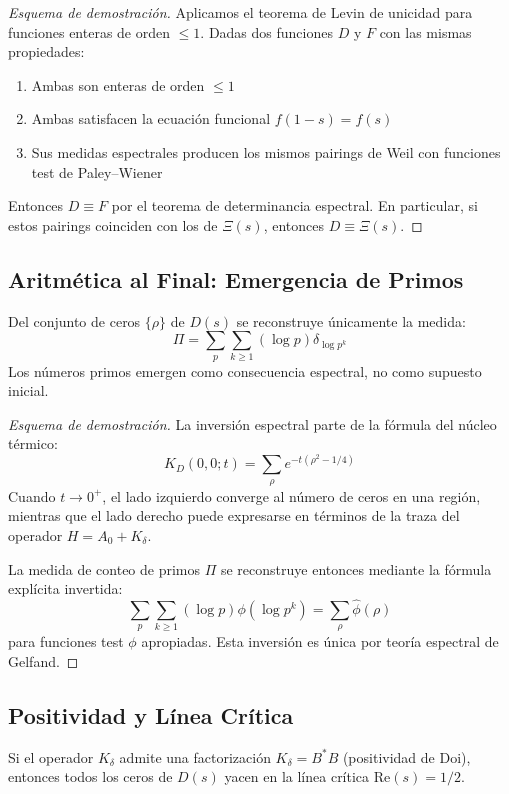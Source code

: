 \begin{proof}[Esquema de demostración]
Aplicamos el teorema de Levin de unicidad para funciones enteras de orden $\leq 1$. Dadas dos funciones $D$ y $F$ con las mismas propiedades:
\begin{enumerate}
\item Ambas son enteras de orden $\leq 1$
\item Ambas satisfacen la ecuación funcional $f(1-s) = f(s)$
\item Sus medidas espectrales producen los mismos pairings de Weil con funciones test de Paley–Wiener
\end{enumerate}
Entonces $D \equiv F$ por el teorema de determinancia espectral. En particular, si estos pairings coinciden con los de $\Xi(s)$, entonces $D \equiv \Xi(s)$.
\end{proof}

\subsection{Aritmética al Final: Emergencia de Primos}

\begin{theorem}
Del conjunto de ceros $\{\rho\}$ de $D(s)$ se reconstruye únicamente la medida:
\[
\Pi = \sum_p \sum_{k\geq 1} (\log p) \delta_{\log p^k}
\]
Los números primos emergen como consecuencia espectral, no como supuesto inicial.
\end{theorem}

\begin{proof}[Esquema de demostración]
La inversión espectral parte de la fórmula del núcleo térmico:
\[
K_D(0,0;t) = \sum_{\rho} e^{-t(\rho^2 - 1/4)}
\]
Cuando $t \to 0^+$, el lado izquierdo converge al número de ceros en una región, mientras que el lado derecho puede expresarse en términos de la traza del operador $H = A_0 + K_\delta$.

La medida de conteo de primos $\Pi$ se reconstruye entonces mediante la fórmula explícita invertida:
\[
\sum_p \sum_{k \geq 1} (\log p) \phi(\log p^k) = \sum_{\rho} \hat{\phi}(\rho)
\]
para funciones test $\phi$ apropiadas. Esta inversión es única por teoría espectral de Gelfand.
\end{proof}

\subsection{Positividad y Línea Crítica}

\begin{theorem}
Si el operador $K_\delta$ admite una factorización $K_\delta = B^* B$ (positividad de Doi), entonces todos los ceros de $D(s)$ yacen en la línea crítica $\text{Re}(s) = 1/2$.
\end{theorem}

